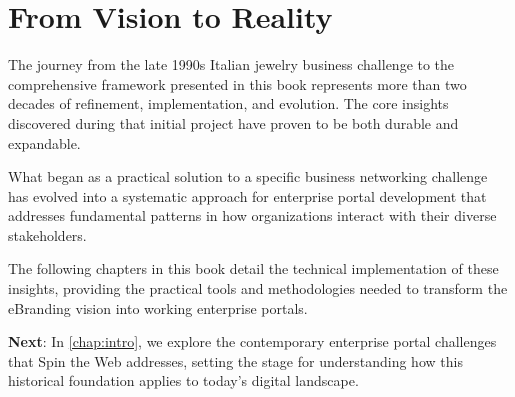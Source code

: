 \section{From Vision to Reality}

The journey from the late 1990s Italian jewelry business challenge to the comprehensive framework presented in this book represents more than two decades of refinement, implementation, and evolution. The core insights discovered during that initial project have proven to be both durable and expandable.

What began as a practical solution to a specific business networking challenge has evolved into a systematic approach for enterprise portal development that addresses fundamental patterns in how organizations interact with their diverse stakeholders.

The following chapters in this book detail the technical implementation of these insights, providing the practical tools and methodologies needed to transform the eBranding vision into working enterprise portals.

	\textbf{Next}: In \cref{chap:intro}, we explore the contemporary enterprise portal challenges that Spin the Web addresses, setting the stage for understanding how this historical foundation applies to today's digital landscape.
